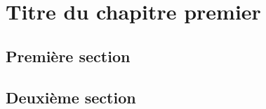 \chapter{Titre du chapitre premier}
\label{chap-1}

\section{Première section}\label{sec-1-1}

\section{Deuxième section}\label{sec-1-2}


